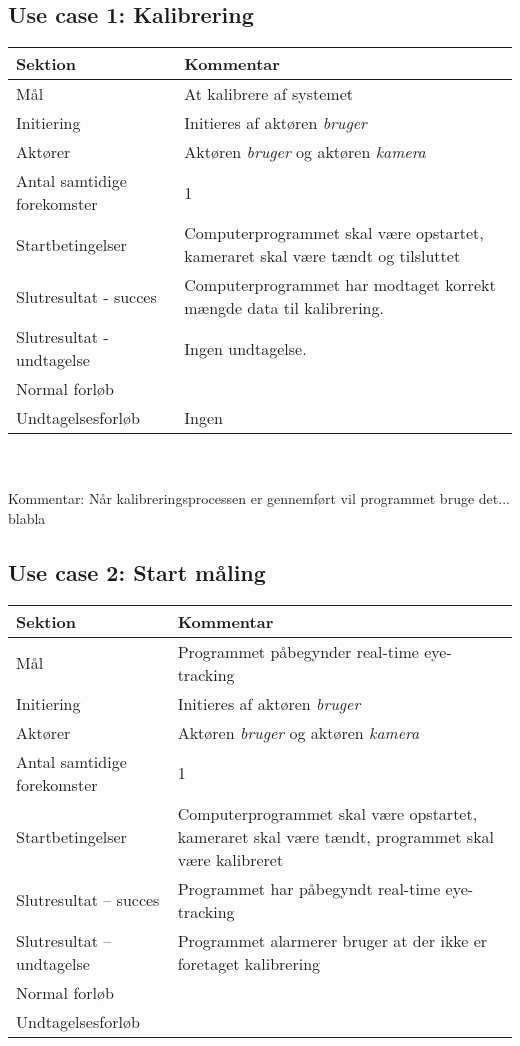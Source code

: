 \documentclass[a4paper,oneside,12pt]{article}
\begin{document}
	\subsection{Use case 1: Kalibrering}
	\begin{tabular}{|l|p{7.7cm}|}
		\hline \textbf{Sektion} & \textbf{Kommentar} \\ 
		\hline Mål & At kalibrere af systemet \\ 
		\hline Initiering & Initieres af aktøren \textit{bruger} \\ 
		\hline Aktører & Aktøren \textit{bruger} og aktøren \textit{kamera} \\ 
		\hline Antal samtidige forekomster & 1 \\ 
		\hline Startbetingelser & Computerprogrammet skal være opstartet, kameraret skal være tændt og tilsluttet \\ 	
		\hline Slutresultat - succes & Computerprogrammet har modtaget korrekt mængde data til kalibrering. \\ 
		\hline Slutresultat - undtagelse &  Ingen undtagelse. \\ 
		\hline Normal forløb &  \\ 
		\hline Undtagelsesforløb & Ingen \\ 
		\hline 
	\end{tabular} \\ \\
	Kommentar: Når kalibreringsprocessen er gennemført vil programmet bruge det... blabla
	
	\subsection{Use case 2: Start måling}
	\begin{tabular}{|l|p{7.7cm}|}
		\hline \textbf{Sektion} 	& \textbf{Kommentar} \\ 
		\hline Mål  & Programmet påbegynder real-time eye-tracking \\ 
		\hline Initiering  & Initieres af aktøren \textit{bruger} \\ 
		\hline Aktører & Aktøren \textit{bruger} og aktøren \textit{kamera} \\ 
		\hline Antal samtidige forekomster & 1 \\ 
		\hline Startbetingelser & Computerprogrammet skal være opstartet, kameraret skal være tændt, programmet skal være kalibreret  \\ 
		\hline Slutresultat – succes & Programmet har påbegyndt real-time eye-tracking \\ 
		\hline Slutresultat – undtagelse & Programmet alarmerer bruger at der ikke er foretaget kalibrering \\ 
		\hline Normal forløb &  \\ 
		\hline Undtagelsesforløb &  \\ 
		\hline 
	\end{tabular}
	
	
\end{document}
